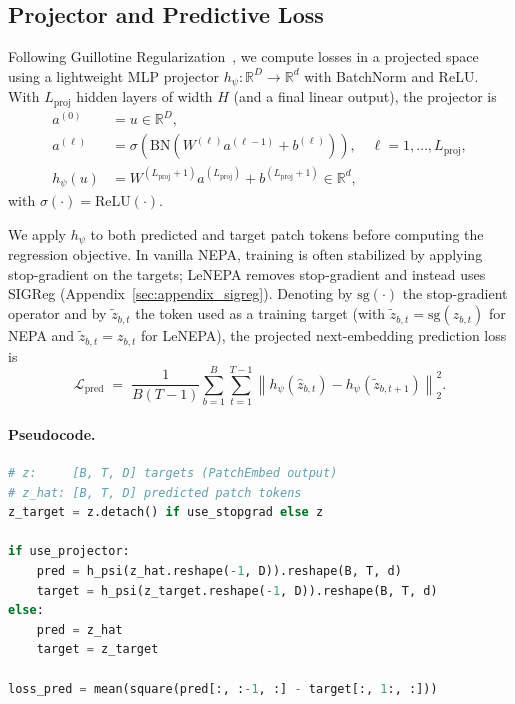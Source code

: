 \subsection{Projector and Predictive Loss}
\label{sec:appendix_projector}

Following Guillotine Regularization~\citep{bordes2022guillotine}, we compute losses in a projected space using a lightweight MLP projector $h_{\psi}:\mathbb{R}^{D}\rightarrow\mathbb{R}^{d}$ with BatchNorm and ReLU.
With $L_{\text{proj}}$ hidden layers of width $H$ (and a final linear output), the projector is
\begin{align}
  a^{(0)} &= u \in \mathbb{R}^{D}, \\
  a^{(\ell)} &= \sigma\!\left(\mathrm{BN}\!\left(W^{(\ell)}a^{(\ell-1)} + b^{(\ell)}\right)\right), \quad \ell=1,\dots,L_{\text{proj}}, \\
  h_{\psi}(u) &= W^{(L_{\text{proj}}+1)}a^{(L_{\text{proj}})} + b^{(L_{\text{proj}}+1)} \in \mathbb{R}^{d},
\end{align}
with $\sigma(\cdot)=\mathrm{ReLU}(\cdot)$.

We apply $h_{\psi}$ to both predicted and target patch tokens before computing the regression objective.
In vanilla NEPA, training is often stabilized by applying stop-gradient on the targets; LeNEPA removes stop-gradient and instead uses SIGReg (Appendix~\ref{sec:appendix_sigreg}).
Denoting by $\mathrm{sg}(\cdot)$ the stop-gradient operator and by $\tilde{z}_{b,t}$ the token used as a training target (with $\tilde{z}_{b,t}=\mathrm{sg}(z_{b,t})$ for NEPA and $\tilde{z}_{b,t}=z_{b,t}$ for LeNEPA), the projected next-embedding prediction loss is
\begin{equation}
  \mathcal{L}_{\text{pred}}
  \;=\;
  \frac{1}{B(T-1)}\sum_{b=1}^{B}\sum_{t=1}^{T-1}
  \left\| h_{\psi}(\hat{z}_{b,t}) - h_{\psi}(\tilde{z}_{b,t+1}) \right\|_2^2.
\label{eq:lenepa_pred}
\end{equation}

\paragraph{Pseudocode.}
\begin{lstlisting}[language=Python,caption={Projected next-embedding prediction loss (NEPA vs.\ LeNEPA)},label={lst:lenepa_pred_loss}]
# z:     [B, T, D] targets (PatchEmbed output)
# z_hat: [B, T, D] predicted patch tokens
z_target = z.detach() if use_stopgrad else z

if use_projector:
    pred = h_psi(z_hat.reshape(-1, D)).reshape(B, T, d)
    target = h_psi(z_target.reshape(-1, D)).reshape(B, T, d)
else:
    pred = z_hat
    target = z_target

loss_pred = mean(square(pred[:, :-1, :] - target[:, 1:, :]))
\end{lstlisting}

